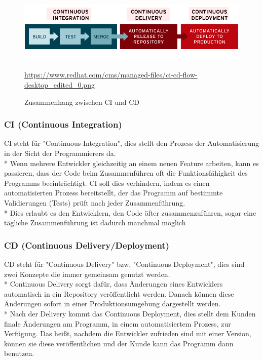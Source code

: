 \begin{figure}[htp]
    \centering
    \author{RedHat}
    \includegraphics[scale=0.5]{pics/ci_cdi_grafik.png}
    \caption{Zusammenhang zwischen CI und CD}
    \small \url{https://www.redhat.com/cms/managed-files/ci-cd-flow-desktop_edited_0.png} 
    \label{fig:impl:CICD}
\end{figure}

\subsubsection{CI (Continuous Integration)}
\label{sec:CI}
CI steht für "Continuous Integration", dies stellt den Prozess der Automatisierung in der Sicht der Programmierers da. \\*
Wenn mehrere Entwickler gleichzeitig an einem neuen Feature arbeiten, kann es passieren, dass der Code beim Zusammenführen oft die Funktionsfähigkeit des Programms beeinträchtigt.
CI soll dies verhindern, indem es einen automatisierten Prozess bereitstellt, der das Programm auf bestimmte Validierungen (Tests) prüft nach jeder Zusammenführung.\\* Dies erlaubt 
es den Entwicklern, den Code öfter zusammenzuführen, sogar eine tägliche Zusammenführung ist dadurch manchmal möglich \cite{RHatCICD}

\subsubsection{CD (Continuous Delivery/Deployment)}
\label{sec:CD}
CD steht für "Continuous Delivery" bzw. "Continuous Deployment", dies sind zwei Konzepte die immer gemeinsam genutzt werden. \\*
Continuous Delivery sorgt dafür, dass Änderungen eines Entwicklers automatisch in ein Repository veröffentlicht werden. Danach können diese Änderungen sofort in einer Produktionsumgebung
dargestellt werden. \\*
Nach der Delivery kommt das Continuous Deployment, dies stellt dem Kunden finale Änderungen am Programm, in einem automatisiertem Prozess, zur Verfügung.
Das heißt, nachdem die Entwickler zufrieden sind mit einer Version, können sie diese veröffentlichen und der Kunde kann das Programm dann benutzen.\cite{RHatCICD}
\pagebreak

